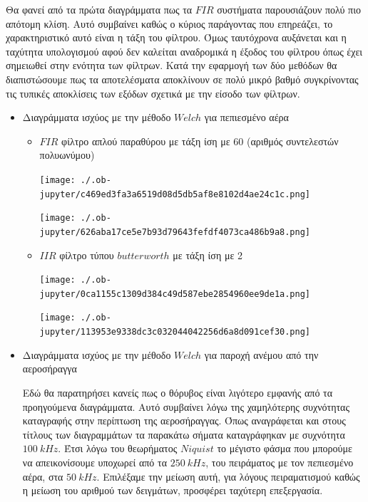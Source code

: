 \documentclass[breaklines=true, 12pt]{article}
\begin{document}
Θα φανεί από τα πρώτα διαγράμματα πως τα \(FIR\) συστήματα παρουσιάζουν πολύ
πιο απότομη κλίση. Αυτό συμβαίνει καθώς ο κύριος παράγοντας που επηρεάζει,
το χαρακτηριστικό αυτό είναι η τάξη του φίλτρου. Όμως ταυτόχρονα αυξάνεται
και η ταχύτητα υπολογισμού αφού δεν καλείται αναδρομικά η έξοδος του
φίλτρου όπως έχει σημειωθεί στην ενότητα των φίλτρων. Κατά την εφαρμογή
των δύο μεθόδων θα διαπιστώσουμε πως τα αποτελέσματα αποκλίνουν σε πολύ
μικρό βαθμό συγκρίνοντας τις τυπικές αποκλίσεις των εξόδων σχετικά με την
είσοδο των φίλτρων.

\begin{itemize}
\item Διαγράμματα ισχύος με την μέθοδο \(Welch\) για πεπιεσμένο αέρα
\begin{itemize}
\item \(FIR\) φίλτρο απλού παραθύρου με τάξη ίση με 60 (αριθμός συντελεστών πολυωνύμου)
\begin{center}
\texttt{[image: ./.ob-jupyter/c469ed3fa3a6519d08d5db5af8e8102d4ae24c1c.png]}
\end{center}
\begin{center}
\texttt{[image: ./.ob-jupyter/626aba17ce5e7b93d79643fefdf4073ca486b9a8.png]}
\end{center}
\item \(IIR\) φίλτρο τύπου \(butterworth\) με τάξη ίση με 2
\begin{center}
\texttt{[image: ./.ob-jupyter/0ca1155c1309d384c49d587ebe2854960ee9de1a.png]}
\end{center}
\begin{center}
\texttt{[image: ./.ob-jupyter/113953e9338dc3c032044042256d6a8d091cef30.png]}
\end{center}
\end{itemize}

\item Διαγράμματα ισχύος με την μέθοδο \(Welch\) για παροχή ανέμου από την αεροσήραγγα

Εδώ θα παρατηρήσει κανείς πως ο θόρυβος είναι λιγότερο εμφανής από τα
προηγούμενα διαγράμματα. Αυτό συμβαίνει λόγω της χαμηλότερης συχνότητας
καταγραφής στην περίπτωση της αεροσήραγγας. Όπως αναγράφεται και στους
τίτλους των διαγραμμάτων τα παρακάτω σήματα καταγράφηκαν με συχνότητα
\(100\ kHz\). Έτσι λόγω του θεωρήματος \(Niquist\) το μέγιστο φάσμα που
μπορούμε να απεικονίσουμε υποχωρεί από τα \(250\ kHz\), του πειράματος με
τον πεπιεσμένο αέρα, στα \(50\ kHz\). Επιλέξαμε την μείωση αυτή, για
λόγους πειραματισμού καθώς η μείωση του αριθμού των δειγμάτων, προσφέρει
ταχύτερη επεξεργασία.


\end{itemize}
\end{document}
